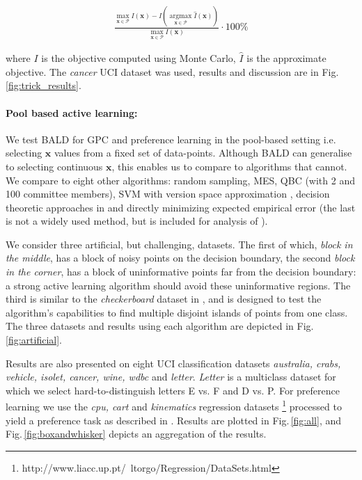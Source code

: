 \documentclass[twoside]{article}
\newcommand{\x}{\bm{x}}
\newcommand{\argmax}{ \operatorname*{arg \max}}
\newcommand{\ourmethod}{BALD } %
\begin{document}
\begin{align}
\frac{ \max_{\x\in\mathcal{P}} I(\x) - I(\argmax_{\x\in\mathcal{P}}\hat{I}(\x)) }{{\max_{\x\in\mathcal{P}}I(\x) }}\cdot 100\% 
\end{align}

where $I$ is the objective computed using Monte Carlo, $\hat{I}$ is the approximate objective. The \emph{cancer} UCI dataset was used, results and discussion are in Fig.\,\ref{fig:trick_results}.

\paragraph{Pool based active learning:} We test \ourmethod for GPC and preference learning in the pool-based setting i.e. selecting $\x$ values from a fixed set of data-points. Although BALD can generalise to selecting continuous $\x$, this enables us to compare to algorithms that cannot. We compare to eight other algorithms: random sampling, MES, QBC (with 2 and 100 committee members), SVM with version space approximation \cite{tong2001}, decision theoretic approaches in \cite{kapoor2007, zhu2003} and directly minimizing expected empirical error (the last is not a widely used method, but is included for analysis of \cite{kapoor2007}).

We consider three artificial, but challenging, datasets. The first of which, \emph{block in the middle}, has a block of noisy points on the decision boundary, the second \emph{block in the corner}, has a block of uninformative points far from the decision boundary: a strong active learning algorithm should avoid these uninformative regions. The third is similar to the \emph{checkerboard} dataset in \cite{zhu2003}, and is designed to test the algorithm's capabilities to find multiple disjoint islands of points from one class. The three datasets and results using each algorithm are depicted in Fig.\,\ref{fig:artificial}.

Results are also presented on eight UCI classification datasets \emph{australia, crabs, vehicle, isolet, cancer, wine, wdbc} and \emph{letter}. \emph{Letter} is a multiclass dataset for which we select hard-to-distinguish letters E vs. F and D vs. P. For preference learning we use the \emph{cpu, cart} and \emph{kinematics} regression datasets \footnote{http://www.liacc.up.pt/~ltorgo/Regression/DataSets.html} processed to yield a preference task as described in \cite{chu2005}. Results are plotted in Fig.\,\ref{fig:all}, and Fig.\,\ref{fig:boxandwhisker} depicts an aggregation of the results.
\end{document}
